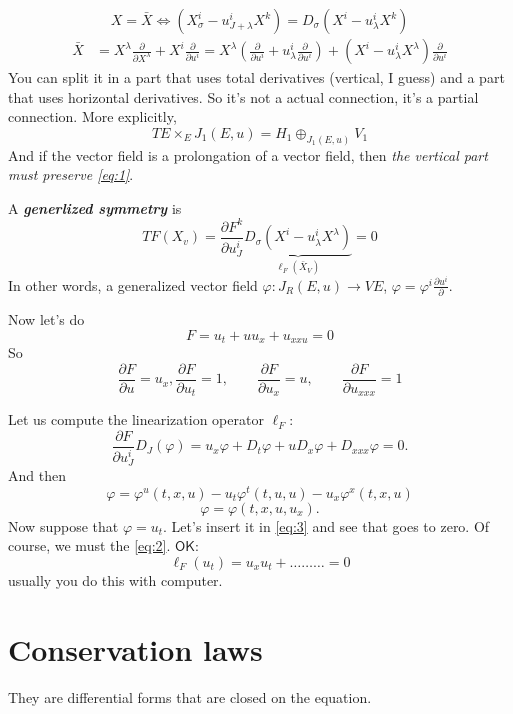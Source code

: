 \begin{equation}\label{eq:1}
X=\bar{X}\iff (X^i_\sigma-u^i_{J+\lambda}X^k)=D_\sigma(X^i-u^i_\lambda X^k)
\end{equation}
\begin{align*}
\bar{X}&=X^\lambda\frac{\partial }{\partial X^\lambda}+X^i\frac{\partial }{\partial u^i}=X^\lambda\left( \frac{\partial }{\partial u^i} +u^i_\lambda\frac{\partial }{\partial u^i}\right) +(X^i-u^i_\lambda X^\lambda)\frac{\partial }{\partial u^i}
\end{align*}
You can split it in a part that uses total derivatives (vertical, I guess) and a part that uses horizontal derivatives. So it's not a actual connection, it's a partial connection. More explicitly,
\[T E \times_E J_1(E,u)=H_1 \oplus_{J_1(E,u)}V_1\]
And if the vector field is a prolongation of a vector field, then \textit{the vertical part must preserve \cref{eq:1}}. 

A \textit{\textbf{generlized symmetry}} is
\[TF(X_v)=\frac{\partial F^k}{\partial u^i_J}\underbrace{D_\sigma(X^i-u^i_\lambda X^\lambda)}_{\ell_F(\bar{X}_V)}=0\]
In other words, a generalized vector field $\varphi:J_R(E,u)\to VE$, $\varphi=\varphi^i \frac{\partial  u^i}{\partial }$.

Now let's do
\begin{equation}\label{eq:2}F=u_t+u u_x + u_{x x u}=0\end{equation}
So
\[\frac{\partial F}{\partial u}=u_x, \frac{\partial F}{\partial u_t}=1,\qquad \frac{\partial F}{\partial u_x}=u	,\qquad \frac{\partial F}{\partial u_{x x x}}=1\]

Let us compute the linearization operator $\ell_F$:
\[\frac{\partial F}{\partial u^i_J}D_J (\varphi)=u_x\varphi+D_t \varphi+u D_x \varphi+ D_{x x x }\varphi=0.\]
And then
 \begin{equation}\label{eq:3}\varphi=\varphi^u(t,x,u)-u_t \varphi^t(t,u,u)-u_x \varphi^x(t,x,u)\end{equation}
 \[\varphi=\varphi(t,x,u,u_x).\]
Now suppose that $\varphi=u_t$. Let's insert it in  \cref{eq:3} and see that goes to zero. Of course, we must the \cref{eq:2}. $\mathsf{OK}$:
\[\ell_F(u_t)=u_xu_t+\ldots \ldots \ldots =0\]
usually you do this with computer.

\section{Conservation laws}

They are differential forms that are closed on the equation.

